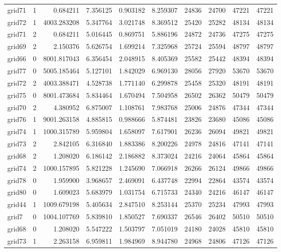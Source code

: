 \begin{longtable}{|l|r|r|r|r|r|r|r|r|r|}
grid71 & 1 & 0.684211 & 7.356125 & 0.903182 & 8.259307 & 24836 & 24700 & 47221 & 47221 \\
grid72 & 1 & 4003.283208 & 5.347764 & 3.021748 & 8.369512 & 25420 & 25282 & 48134 & 48134 \\
grid71 & 2 & 0.684211 & 5.016445 & 0.869751 & 5.886196 & 24872 & 24736 & 47275 & 47275 \\
grid69 & 2 & 2.150376 & 5.626754 & 1.699214 & 7.325968 & 25724 & 25594 & 48797 & 48797 \\
grid66 & 0 & 8001.817043 & 6.356454 & 2.048915 & 8.405369 & 25582 & 25442 & 48394 & 48394 \\
grid77 & 0 & 5005.185464 & 5.127101 & 1.842029 & 6.969130 & 28056 & 27920 & 53670 & 53670 \\
grid72 & 2 & 4003.388471 & 4.528738 & 1.771140 & 6.299878 & 25458 & 25320 & 48191 & 48191 \\
grid75 & 0 & 8001.473684 & 5.834464 & 1.670494 & 7.504958 & 26502 & 26362 & 50479 & 50479 \\
grid70 & 2 & 4.380952 & 6.875007 & 1.108761 & 7.983768 & 25006 & 24876 & 47344 & 47344 \\
grid76 & 1 & 9001.263158 & 4.885815 & 0.988666 & 5.874481 & 23826 & 23680 & 45086 & 45086 \\
grid74 & 1 & 1000.315789 & 5.959804 & 1.658097 & 7.617901 & 26236 & 26094 & 49821 & 49821 \\
grid73 & 2 & 2.842105 & 6.316840 & 1.883386 & 8.200226 & 24978 & 24816 & 47141 & 47141 \\
grid68 & 2 & 1.208020 & 6.186142 & 2.186882 & 8.373024 & 24216 & 24064 & 45864 & 45864 \\
grid74 & 2 & 1000.157895 & 5.821228 & 1.245690 & 7.066918 & 26266 & 26124 & 49866 & 49866 \\
grid78 & 0 & 1.959900 & 3.968657 & 2.469091 & 6.437748 & 22994 & 22864 & 43574 & 43574 \\
grid80 & 0 & 1.609023 & 5.683979 & 1.031754 & 6.715733 & 24340 & 24216 & 46147 & 46147 \\
grid44 & 1 & 1009.679198 & 5.405634 & 2.847510 & 8.253144 & 25370 & 25234 & 47993 & 47993 \\
grid7 & 0 & 1004.107769 & 5.839810 & 1.850527 & 7.690337 & 26546 & 26402 & 50510 & 50510 \\
grid68 & 0 & 1.208020 & 5.547222 & 1.503797 & 7.051019 & 24180 & 24028 & 45810 & 45810 \\
grid73 & 1 & 2.263158 & 6.959811 & 1.984969 & 8.944780 & 24968 & 24806 & 47126 & 47126 \\

\end{longtable}

